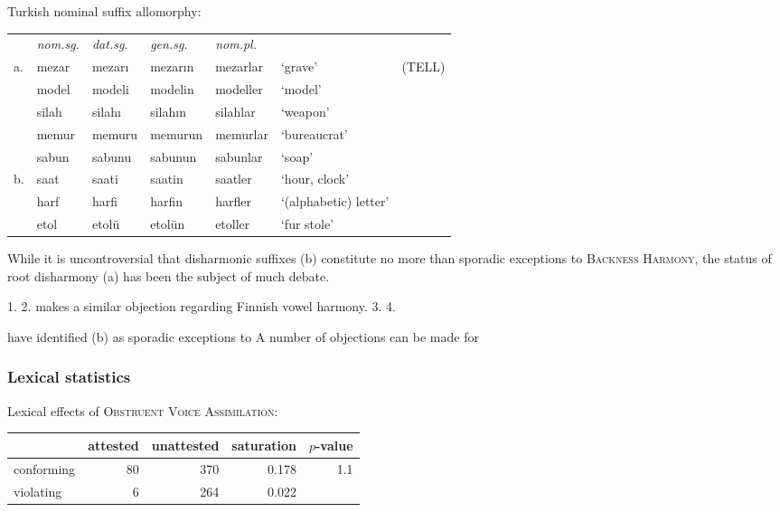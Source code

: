 \ex Turkish nominal suffix allomorphy: \vspace{6pt} \\
\begin{tabular}{l l l l l l l}
   & \emph{nom.sg.} & \emph{dat.sg.} & \emph{gen.sg.} & \emph{nom.pl.} \\
a. & mezar          & mezarı         & mezarın        & mezarlar       & `grave' & (TELL) \\
   & model          & modeli         & modelin        & modeller       & `model' \\
   & silah          & silahı         & silahın        & silahlar       & `weapon'     \\
   & memur          & memuru         & memurun        & memurlar       & `bureaucrat' \\
   & sabun          & sabunu         & sabunun        & sabunlar       & `soap'       \\
b. & saat           & saati          & saatin         & saatler        & `hour, clock' \\
   & harf           & harfi          & harfin         & harfler        & `(alphabetic) letter' \\ %
   & etol           & etolü          & etolün         & etoller        & `fur stole' \\
\end{tabular} \xe

While it is uncontroversial that disharmonic suffixes (\lastx b) constitute no more than sporadic exceptions to \textsc{Backness Harmony}, the status of root disharmony (\lastx a) has been the subject of much debate. 

1. \citet[][289]{Anderson1974} 
2. \citet[][]{Kiparsky1981} makes a similar objection regarding Finnish vowel harmony.
3. \citet{Clements1982}
4. \citet{Inkelas1997}

have identified (\lastx b) as sporadic exceptions to 
A number of objections can be made for 

\subsubsection{Lexical statistics}

\citet{TELL}

\ex Lexical effects of \textsc{Obstruent Voice Assimilation}: \vspace{6pt} \\
\begin{tabular}{l r r r r}
\toprule
           & attested & unattested & saturation & $p$-value \\
\midrule
conforming & 80 & 370 & 0.178 & \multirow{2}{*}{1.1\e{-11}}\\
violating  &  6 & 264 & 0.022 \\
\bottomrule
\end{tabular} \xe 

